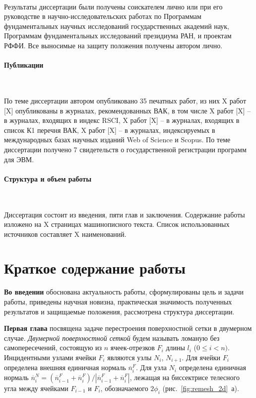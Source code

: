\documentclass[a4paper,14pt]{extarticle}                     %
\theoremstyle{plain}                                         %
\begin{document}
\

Результаты диссертации были получены соискателем лично или при его руководстве в научно-исследовательских работах по Программам фундаментальных научных исследований государственных академий наук, Программам фундаментальных исследований президиума РАН, и проектам РФФИ.
Все выносимые на защиту положения получены автором лично.

\paragraph{Публикации} 

\

По теме диссертации автором опубликовано 35 печатных работ, из них X работ [X] опубликованы в журналах, рекомендованных ВАК, в том числе X работ [X] -- в журналах, входящих в индекс RSCI, X работ [X] -- в журналах, входящих в список К1 перечня ВАК, X работ [X] -- в журналах, индексируемых в международных базах научных изданий Web of Science и Scopus.
По теме диссертации получено 7 свидетельств о государственной регистрации программ для ЭВМ.

\paragraph{Структура и объем работы} 

\

Диссертация состоит из введения, пяти глав и заключения.
Содержание работы изложено на X страницах машинописного текста.
Список использованных источников составляет X наименований.


\newpage
\section*{Краткое содержание работы}

\textbf{Во введении} обоснована актуальность работы, сформулированы цель и задачи работы, приведены научная новизна, практическая значимость полученных результатов и защищаемые положения, рассмотрена структура диссертации. 


\textbf{Первая глава} посвящена задаче перестроения поверхностной сетки в двумерном случае.
\textit{Двумерной поверхностной сеткой} будем называть ломаную без самопересечений, состоящую из $n$ ячеек-отрезков $F_i$ длины $l_i$ ($0 \le i < n)$. Инцидентными узлами ячейки $F_i$ являются узлы $N_i$, $N_{i + 1}$. Для ячейки $F_i$ определена внешняя единичная нормаль $\overline{n}_i^F$.
Для узла $N_i$ определена единичная нормаль $\overline{n}_i^N = (\overline{n}_{i-1}^F + \overline{n}_i^F) / |\overline{n}_{i-1}^F + \overline{n}_i^F|$, лежащая на биссектрисе телесного угла между ячейками $F_{i - 1}$ и $F_i$, обозначаемого $2 \phi_i$ (рис.~\ref{fig:remesh_2d}~а).
\end{document}
